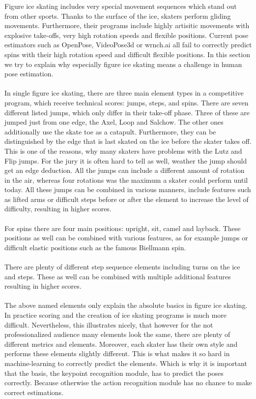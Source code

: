     Figure ice skating includes very special movement sequences which stand out from other sports.
    Thanks to the surface of the ice, skaters perform gliding movements.
    Furthermore, their programs include highly artisitic
    movements with explosive take-offs, very high rotation speeds and flexible positions.
    Current pose estimators such as OpenPose, VideoPose3d or wrnch.ai all fail to correctly predict
    spins with their high
    rotation speed and difficult flexible positions.
    In this section we try to explain why especially figure ice skating means a challenge in human pose estimation.
    \\\mbox{}\\
    In single figure ice skating, there are three main element types in a competitive program, which receive
    technical scores:
    jumps, steps, and spins.
    There are seven different listed jumps, which only differ in their take-off phase.
    Three
    of these
    are jumped just from one edge, the Axel, Loop and Salchow.
    The other ones additionally use the skate toe as a catapult.
    Furthermore, they can be distinguished by the edge that is last skated on the ice before the skater takes off.
    This is one of the reasons, why many skaters have problems with the Lutz and Flip jumps.
    For the jury it is often hard to tell as well, weather the jump should get an edge deduction.
    All the jumps can include a different amount of rotation in the air,
    whereas four rotations was the maximum a skater could perform until today.
    All these jumps can be combined in various manners, include features such as lifted arms or difficult steps
    before or after the element to
    increase the level of difficulty, resulting in higher scores.
    \\\mbox{}\\
    For spins there are four main positions: upright, sit, camel and layback.
    These positions as well can be combined with various features, as for example jumps or difficult elastic positions
    such as the famous Biellmann spin.
    \\\mbox{}\\
    There are plenty of different step sequence elements including turns on the ice and steps.
    These as well can be combined with multiple additional features resulting in higher scores.
    \\\mbox{}\\
    The above named elements only explain the absolute basics in figure ice skating.
    In practice scoring and the
    creation of ice skating
    programs is much more difficult.
    Nevertheless, this illustrates nicely, that however for the not professionalized
    audience many elements
    look the same, there are plenty of different metrics and elements.
    Moreover, each skater has their own style
    and performs these elements
    slightly different.
    This is what makes it so hard in machine-learning to correctly predict the elements.
    Which is
    why it is important that
    the basis, the keypoint recognition module, has to predict the poses correctly.
    Because otherwise the action
    recognition module has no
    chance to make correct estimations.

